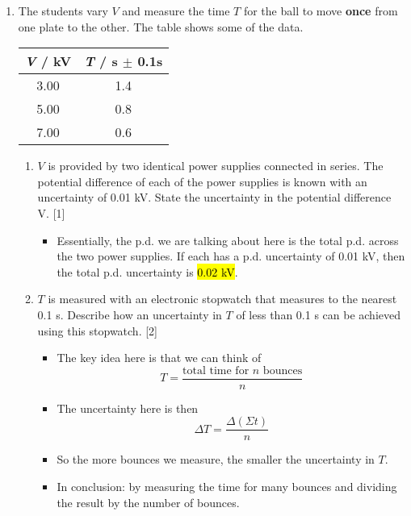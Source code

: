 \documentclass[a4paper,12pt]{article}
\DeclareRobustCommand{\hlans}[1]{{\sethlcolor{ForestGreen!30!white}\hl{#1}}}
\begin{document}
\begin{enumerate}[label=(\alph*)]
  \item The students vary $V$ and measure the time $T$ for the ball to move \textbf{once} from one plate to the other. The table shows some of the data.
        \begin{table}[H]
          \centering
          \begin{tabular}{|c|c|}
            \hline
            \textit{V} / kV & \textit{T} / s $\pm$ 0.1s \\ \hline
            3.00            & 1.4                       \\ \hline
            5.00            & 0.8                       \\ \hline
            7.00            & 0.6                       \\ \hline
          \end{tabular}
        \end{table}

        \begin{enumerate}[]
          \item $V$ is provided by two identical power supplies connected in series. The potential difference of each of the power supplies is known with an uncertainty of 0.01 kV.
                State the uncertainty in the potential difference V. \hfill [1]
                \begin{itemize}
                  \item Essentially, the p.d. we are talking about here is the total p.d. across the two power supplies. If each has a p.d. uncertainty of 0.01 kV, then the total p.d. uncertainty is \hlans{0.02 kV}.
                \end{itemize}
          \item $T$ is measured with an electronic stopwatch that measures to the nearest 0.1 s.
                Describe how an uncertainty in $T$ of less than 0.1 s can be achieved using this stopwatch. \hfill [2]
                \begin{itemize}
                  \item The key idea here is that we can think of $$T = \frac{\text{total time for $n$ bounces}}{n}$$
                  \item The uncertainty here is then $$\Delta T = \frac{\Delta (\Sigma t)}{n}$$
                  \item So the more bounces we measure, the smaller the uncertainty in $T$.
                  \item In conclusion: by measuring the time for many bounces and dividing the result by the number of bounces.
                \end{itemize}


\end{enumerate}
\end{enumerate}
\end{document}
